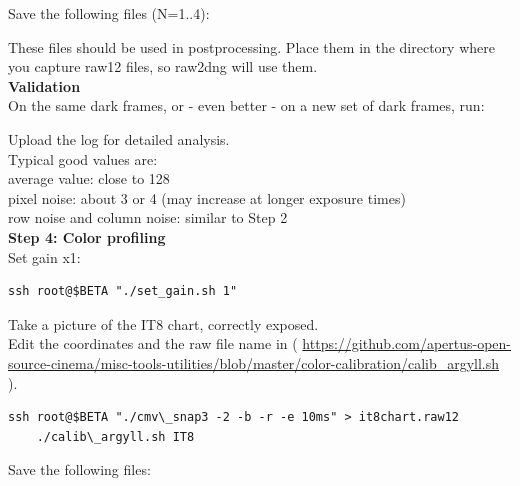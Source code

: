 {Save the following files (N=1..4): 
 
    
These files should be used in postprocessing. Place them in the directory where you capture raw12 files, so raw2dng will use them.\\

\textbf{Validation}\\ 

On the same dark frames, or - even better - on a new set of dark frames, run: 


Upload the log for detailed analysis.\\

Typical good values are:\\

average value: close to 128\\

pixel noise: about 3 or 4 (may increase at longer exposure times)\\

row noise and column noise: similar to Step 2\\

\textbf{Step 4: Color profiling}\\

Set gain x1:

\begin{lstlisting}[breaklines=true, breakatwhitespace=true]
ssh root@$BETA "./set_gain.sh 1"
\end{lstlisting} 

Take a picture of the IT8 chart, correctly exposed.\\

Edit the coordinates and the raw file name in  ( \href{https://github.com/apertus-open-source-cinema/misc-tools-utilities/blob/master/color-calibration/calib_argyll.sh}{https://github.com/apertus-open-source-cinema/misc-tools-utilities/blob/master/color-calibration/calib_argyll.sh} ). 

\begin{lstlisting}[breaklines=true, breakatwhitespace=true]
    ssh root@$BETA "./cmv\_snap3 -2 -b -r -e 10ms" > it8chart.raw12
    ./calib\_argyll.sh IT8
\end{lstlisting} 

Save the following files:\\

}
